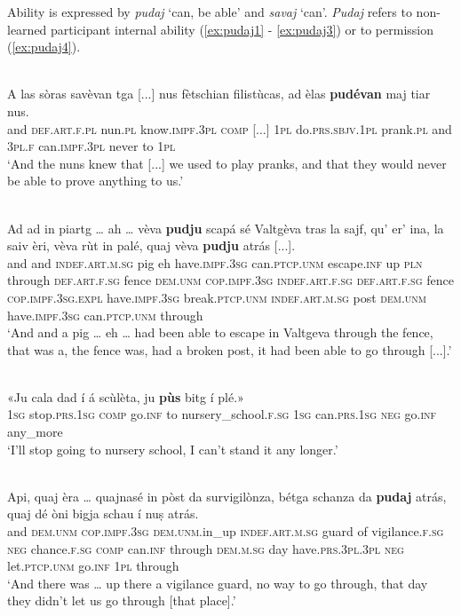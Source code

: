 Ability is expressed by \textit{pudaj} `can, be able' and \textit{savaj} `can'. \textit{Pudaj} refers to non-learned participant internal ability (\ref{ex:pudaj1} - \ref{ex:pudaj3}) or to permission (\ref{ex:pudaj4}).

\ea
\label{ex:pudaj1}
\\
\gll    A las sòras savèvan tga [...] nus fètschian filistùcas, ad èlas \textbf{pudévan} maj tiar nus.\\
and \textsc{def.art.f.pl} nun.\textsc{pl} know.\textsc{impf.3pl} \textsc{comp} [...] \textsc{1pl} do.\textsc{prs.sbjv.1pl} prank.\textsc{pl} and \textsc{3pl.f} can.\textsc{impf.3pl} never to \textsc{1pl}\\
\glt `And the nuns knew that [...] we used to play pranks, and that they would never be able to prove anything to us.'
\z

\ea
\label{ex:pudaj2}
\\
\gll    Ad ad in piartg … ah … vèva \textbf{pudju} scapá sé Valtgèva tras la sajf, qu’ er’ ina, la saiv èri, vèva rùt in palé, quaj vèva \textbf{pudju} atrás [...].\\
and and \textsc{indef.art.m.sg} pig {} eh {}  have.\textsc{impf.3sg} can.\textsc{ptcp.unm} escape.\textsc{inf} up \textsc{pln} through \textsc{def.art.f.sg} fence  \textsc{dem.unm} \textsc{cop.impf.3sg}  \textsc{indef.art.f.sg} \textsc{def.art.f.sg} fence \textsc{cop.impf.3sg.expl} have.\textsc{impf.3sg} break.\textsc{ptcp.unm}  \textsc{indef.art.m.sg} post \textsc{dem.unm}  have.\textsc{impf.3sg} can.\textsc{ptcp.unm} through \\
\glt `And and a pig … eh … had been able to escape in Valtgeva through the fence, that was a, the fence was, had a broken post, it had been able to go through [...].'
\z

\ea
\label{ex:pudaj3}
\\
\gll  «Ju cala dad í á scùlèta, ju \textbf{pùs} bitg í plé.»\\
\textsc{1sg} stop.\textsc{prs.1sg} \textsc{comp} go.\textsc{inf} to nursery\_school.\textsc{f.sg} \textsc{1sg} can.\textsc{prs.1sg} \textsc{neg} go.\textsc{inf} any\_more  \\
\glt `I’ll stop going to nursery school, I can’t stand it any longer.'
\z

\ea
\label{ex:pudaj4}
\\
\gll  Api, quaj èra … quajnasé in pòst da survigilònza, bétga schanza da \textbf{pudaj} atrás, quaj dé òni bigja schau í nuṣ atrás.\\
and \textsc{dem.unm} \textsc{cop.impf.3sg} {} \textsc{dem.unm}.in\_up \textsc{indef.art.m.sg} guard of vigilance.\textsc{f.sg} \textsc{neg} chance.\textsc{f.sg} \textsc{comp} can.\textsc{inf} through \textsc{dem.m.sg} day have.\textsc{prs.3pl.3pl} \textsc{neg} let.\textsc{ptcp.unm} go.\textsc{inf} \textsc{1pl} through\\
\glt `And there was … up there a vigilance guard, no way to go through, that day they didn’t let us go through [that place].'
\z


